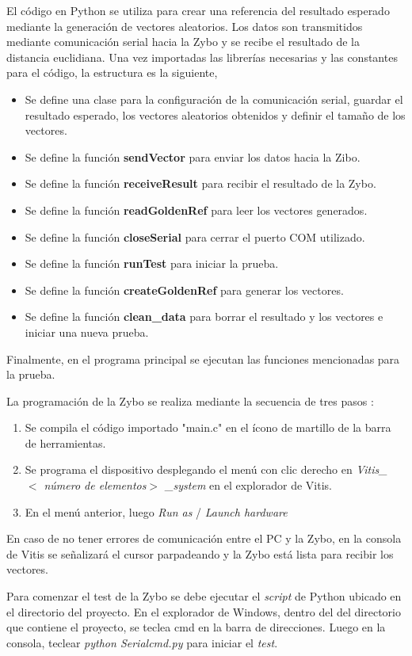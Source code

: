 \documentclass[conference]{IEEEtran}
\begin{document}
El código en Python se utiliza para crear una referencia del resultado esperado mediante la generación de vectores aleatorios. Los datos son transmitidos mediante comunicación serial hacia la Zybo y se recibe el resultado de la distancia euclidiana.  Una vez importadas las librerías necesarias y las constantes  para el código, la estructura es la siguiente,
\begin{itemize}
    \item Se define una clase para la configuración de la comunicación serial, guardar el resultado esperado, los vectores aleatorios obtenidos y definir el tamaño de los vectores.
    \item Se define la función \textbf{sendVector} para enviar los datos hacia la Zibo.
    \item Se define la función \textbf{receiveResult} para recibir el resultado de la Zybo.
    \item Se define la función \textbf{readGoldenRef} para leer los vectores generados.
    \item Se define la función \textbf{closeSerial} para cerrar el puerto COM utilizado.
        \item Se define la función \textbf{runTest} para iniciar la prueba.
    \item Se define la función \textbf{	 createGoldenRef} para generar los vectores.
     \item Se define la función \textbf{	 clean\_data} para borrar el resultado y los vectores e iniciar una nueva prueba.
\end{itemize}
Finalmente, en el programa principal se ejecutan las funciones mencionadas para la prueba. \par
La programación de la Zybo se realiza mediante la secuencia de tres pasos : 
\begin{enumerate}
    \item Se compila el código importado "main.c" en el ícono de martillo de la barra de herramientas.
    \item Se programa el dispositivo desplegando el menú con clic derecho en \textit{Vitis\_ $<$ número de elementos$>$ \_system} en el explorador de Vitis.
    \item En el menú anterior, luego \textit{Run as} / \textit{ Launch hardware}
\end{enumerate}
En caso de no tener errores de comunicación entre el PC y la Zybo, en la consola de Vitis se señalizará el cursor  parpadeando y la Zybo está lista para recibir los vectores. \par
Para comenzar el test de la Zybo se debe ejecutar el \textit{script} de Python ubicado en el directorio del proyecto. En el explorador de Windows, dentro del del directorio que contiene el proyecto, se teclea cmd en la barra de direcciones. Luego en la consola, teclear \textit{python Serialcmd.py} para iniciar el \textit{test}.
\end{document}
